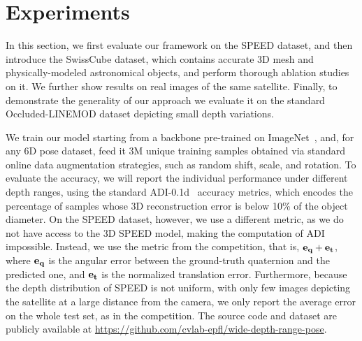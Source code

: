 
\section{Experiments}
\label{sec:experiments}

In this section, we first evaluate our framework on the SPEED dataset, and then introduce the SwissCube dataset, which contains accurate 3D mesh and physically-modeled astronomical objects, and perform thorough ablation studies on it. We further show results on real images of the same satellite. Finally, to demonstrate the generality of our approach we evaluate it on the standard Occluded-LINEMOD dataset depicting small depth variations. 

We train our model starting from a backbone pre-trained on ImageNet~\cite{Deng09}, and, for any 6D pose dataset, feed it 3M unique training samples obtained via standard online data augmentation strategies, such as random shift, scale, and rotation. To evaluate the accuracy, we will report the individual performance under different depth ranges, using the standard ADI-0.1d~\cite{Hu19a,Hu20a} accuracy metrics, which encodes the percentage of samples whose 3D reconstruction error is below 10\% of the object diameter. On the SPEED dataset, however, we use a different metric, as we do not have access to the 3D SPEED model, making the computation of ADI impossible. Instead, we use the metric from the competition, that is, ${\bf e}_{\bf q}+{\bf e}_{\bf t}$, where ${\bf e}_{\bf q}$ is the angular error between the ground-truth quaternion and the predicted one, and ${\bf e}_{\bf t}$ is the normalized translation error. Furthermore, because the depth distribution of SPEED is not uniform, with only few images depicting the satellite at a large distance from the camera, we only report the average error on the whole test set, as in the competition.
The source code and dataset are publicly available at \href{https://github.com/cvlab-epfl/wide-depth-range-pose}{https://github.com/cvlab-epfl/wide-depth-range-pose}.

